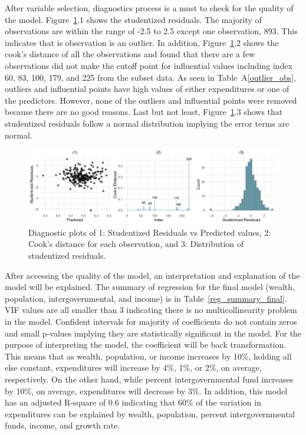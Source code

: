 \documentclass[11pt]{article}\usepackage[]{graphicx}\usepackage[]{color}
\makeatletter
\def\maxwidth{ %
  \ifdim\Gin@nat@width>\linewidth
    \linewidth
  \else
    \Gin@nat@width
  \fi
}
\makeatother
\begin{document}
\noindent After variable selection, diagnostics process is a must to check for the quality of the model. Figure~\ref{diag-plot1}.1 shows the studentized residuals. The majority of observations are within the range of -2.5 to 2.5 except one observation, 893. This indicates that is observation is an outlier. In addition, Figure~\ref{diag-plot1}.2 shows the cook's distance of all the observations and found that there are a few observations did not make the cutoff point for influential values including index 60, 83, 100, 179, and 225 from the subset data. As seen in Table~A\ref{outlier_obs}, outliers and influential points have high values of either expenditures or one of the predictors. However, none of the outliers and influential points were removed because there are no good reasons. Last but not least, Figure~\ref{diag-plot1}.3 shows that studentized residuals follow a normal distribution implying the error terms are normal.    
\hfill \break

\begin{figure}[h!] 
\begin{center}

\includegraphics[width=\maxwidth]{figure/unnamed-chunk-5-1} 

\caption{Diagnostic plots of 1: Studentized Residuals vs Predicted values, 2: Cook's distance for each observation, and 3: Distribution of studentized residuals.}
\label{diag-plot1}
\end{center} 
\end{figure}

\noindent After accessing the quality of the model, an interpretation and explanation of the model will be explained. The summary of regression for the final model (wealth, population, intergovernmental, and income) is in Table~\ref{reg_summary_final}. VIF values are all smaller than 3 indicating there is no multicollinearity problem in the model. Confident intervals for majority of coefficients do not contain zeros and small p-values implying they are statistically significant in the model. For the purpose of interpreting the model, the coefficient will be back transformation. This means that as wealth, population, or income increases by 10\%, holding all else constant, expenditures will increase by 4\%, 1\%, or 2\%, on average, respectively. On the other hand, while percent intergovernmental fund increases by 10\%, on average, expenditures will decrease by 3\%. In addition, this model has an adjusted R-square of 0.6 indicating that 60\% of the variation in expenditures can be explained by wealth, population, percent intergovernmental funds, income, and growth rate.   
\end{document}
